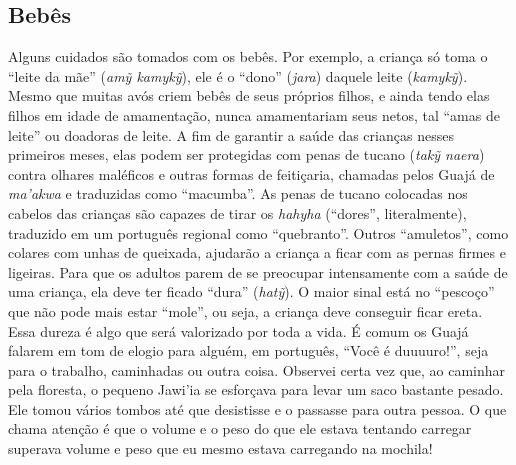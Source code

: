\subsection{Bebês}

Alguns cuidados são tomados com os bebês. Por exemplo, a criança só toma
o ``leite da mãe'' (\emph{amỹ kamykỹ}), ele é o ``dono'' (\emph{jara})
daquele leite (\emph{kamykỹ}). Mesmo que muitas avós criem bebês de seus
próprios filhos, e ainda tendo elas filhos em idade de amamentação,
nunca amamentariam seus netos, tal ``amas de leite'' ou doadoras de leite.
A fim de garantir a saúde das crianças nesses primeiros meses, elas
podem ser protegidas com penas de tucano (\emph{takỹ naera}) contra
olhares maléficos e outras formas de feitiçaria, chamadas pelos Guajá de
\emph{ma'akwa} e traduzidas como ``macumba''. As penas de tucano
colocadas nos cabelos das crianças são capazes de tirar os \emph{hahyha}
(``dores'', literalmente), traduzido em um português regional como
``quebranto''. Outros ``amuletos'', como colares com unhas de queixada,
ajudarão a criança a ficar com as pernas firmes e ligeiras. Para que os
adultos parem de se preocupar intensamente com a saúde de uma criança,
ela deve ter ficado ``dura'' (\emph{hatỹ}). O maior sinal está no
``pescoço'' que não pode mais estar ``mole'', ou seja, a criança deve
conseguir ficar ereta. Essa dureza é algo que será valorizado por toda a
vida. É comum os Guajá falarem em tom de elogio para alguém, em
português, ``Você é duuuuro!'', seja para o trabalho, caminhadas ou
outra coisa. Observei certa vez que, ao caminhar pela floresta, o
pequeno Jawi'ia se esforçava para levar um saco bastante pesado. Ele
tomou vários tombos até que desistisse e o passasse para outra pessoa. O
que chama atenção é que o volume e o peso do que ele estava tentando
carregar superava volume e peso que eu mesmo estava carregando na
mochila!

